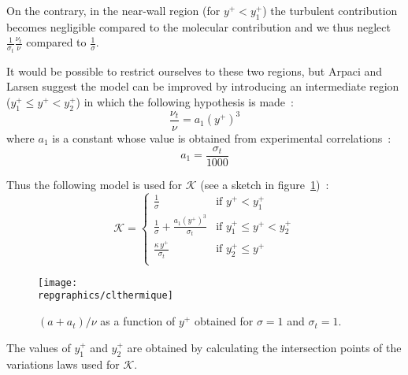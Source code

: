 On the contrary, in the near-wall region (for $y^+ < y^+_1$)
the turbulent contribution becomes negligible 
compared to the molecular contribution and we thus neglect 
$\displaystyle\frac{1}{\sigma_t}\frac{\nu_t}{\nu}$ compared to  
$\displaystyle\frac{1}{\sigma}$.

It would be possible to restrict ourselves to these 
two regions, but Arpaci and Larsen suggest the model 
can be improved by introducing an intermediate 
region ($y^+_1 \leqslant y^+ < y^+_2$) 
in which the following hypothesis is made~:
\begin{equation}
\frac{\nu_t}{\nu} = a_1 (y^+)^3
\end{equation}
where $a_1$ is a constant whose value is obtained from
experimental correlations~:
\begin{equation}
a_1 =\displaystyle\frac{\sigma_t}{1000}
\end{equation}

Thus the following model is used for $\mathcal{K}$ 
(see a sketch
in figure~\ref{Base_Clptur_Fig_a_plus_at_fonction_yplus})~:
\begin{equation}
\mathcal{K}=\left\{
\begin{array}{ll}
\displaystyle\frac{1}{\sigma}
             &\text{if } y^+ < y^+_1\\
\displaystyle\frac{1}{\sigma}
+\displaystyle\frac{a_1 (y^+)^3}{\sigma_t}
             &\text{if } y^+_1 \leqslant y^+ < y^+_2\\
\displaystyle\frac{\kappa \,y^+}{\sigma_t}
             &\text{if } y^+_2\leqslant y^+\\
\end{array}
\right.
\end{equation}

\begin{figure}[htp]\label{Base_Clptur_Fig_a_plus_at_fonction_yplus}
\centerline{\texttt{[image: \\repgraphics/clthermique]}}
\caption{$(a+a_t)/\nu$ as a function of $y^+$ obtained
                       for $\sigma=1$ and $\sigma_t=1$.}
\end{figure}


The values of $y^+_1$ and $y^+_2$ are obtained by calculating 
the intersection points of the variations laws used 
for $\mathcal{K}$.

